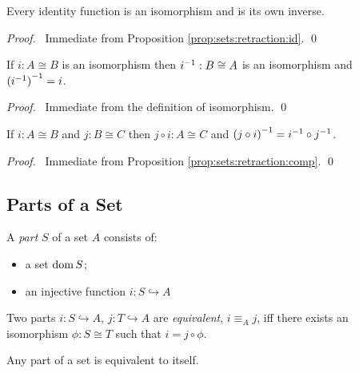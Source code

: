 \begin{prop}
\label{prop:sets:isomorphism:identity}
Every identity function is an isomorphism and is its own inverse.
\end{prop}

\begin{proof}
\pf\ Immediate from Proposition \ref{prop:sets:retraction:id}. \qed
\end{proof}

\begin{prop}
\label{prop:sets:isomorphism:inverse}
If $i : A \cong B$ is an isomorphism then ${i}^{-1} : B \cong A$ is an
isomorphism and ${({i}^{-1})}^{-1} = i$.
\end{prop}

\begin{proof}
\pf\ Immediate from the definition of isomorphism. \qed
\end{proof}

\begin{prop}
  \label{prop:sets:isomorphism:comp}
If $i : A \cong B$ and $j : B \cong C$ then $j \circ i : A \cong C$ and
${(j \circ i)}^{-1} = {i}^{-1} \circ {j}^{-1}$.
\end{prop}

\begin{proof}
\pf\ Immediate from Proposition \ref{prop:sets:retraction:comp}. \qed
\end{proof}


\subsection{Parts of a Set}

\begin{df}[Part]
  A \emph{part} $S$ of a set $A$ consists of:
  \begin{itemize}
   \item a set $\operatorname{dom} S$;
   \item an injective function $i : S \hookrightarrow A$
  \end{itemize}
\end{df}

\begin{df}
  Two parts $i : S \hookrightarrow A$, $j : T \hookrightarrow A$ are
  \emph{equivalent}, $i \equiv_A j$, iff there exists an isomorphism $\phi :
S \cong T$ such that $i = j \circ \phi$.
\end{df}

\begin{prop}
 Any part of a set is equivalent to itself.
\end{prop}

